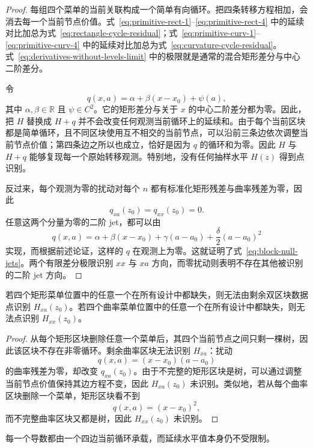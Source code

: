 \begin{proof}
每组四个菜单的当前关联构成一个简单有向循环。把四条转移方程相加，会消去每一个当前节点价值。式~\eqref{eq:primitive-rect-1}--\eqref{eq:primitive-rect-4} 中的延续对比加总为式~\eqref{eq:rectangle-cycle-residual}；式~\eqref{eq:primitive-curv-1}--\eqref{eq:primitive-curv-4} 中的延续对比加总为式~\eqref{eq:curvature-cycle-residual}。式~\eqref{eq:derivatives-without-levels-limit} 中的极限就是通常的混合矩形差分与中心二阶差分。

令
\[
q(x,a)=\alpha+\beta(x-x_0)+\psi(a),
\]
其中 $\alpha,\beta\in\mathbb R$ 且 $\psi\in C^2$。它的矩形差分与关于 $x$ 的中心二阶差分都为零。因此，把 $H$ 替换成 $H+q$ 并不会改变任何观测当前循环上的延续和。由于每个当前区块都是简单循环，且不同区块使用互不相交的当前节点，可以沿前三条边依次调整当前节点价值；第四条边之所以也成立，恰好是因为 $q$ 的循环和为零。因此 $H$ 与 $H+q$ 能够复现每一个原始转移观测。特别地，没有任何抽样水平 $H(z)$ 得到点识别。

反过来，每个观测为零的扰动对每个 $n$ 都有标准化矩形残差与曲率残差为零，因此
\[
q_{xa}(z_0)=q_{xx}(z_0)=0.
\]
任意这两个分量为零的二阶 jet，都可以由
\[
q(x,a)
=
\alpha+\beta(x-x_0)+\gamma(a-a_0)
+\frac{\delta}{2}(a-a_0)^2
\]
实现，而根据前述论证，这样的 $q$ 在观测上为零。这就证明了式~\eqref{eq:block-null-jets}。两个有限差分极限识别 $xx$ 与 $xa$ 方向，而零扰动则表明不存在其他被识别的二阶 jet 方向。
\end{proof}

\begin{corollary}[双区块设计中的边最小性]
\label{cor:two-block-edge-minimal}
若四个矩形菜单位置中的任意一个在所有设计中都缺失，则无法由剩余双区块数据点识别 $H_{xa}(z_0)$。若四个曲率菜单位置中的任意一个在所有设计中都缺失，则无法点识别 $H_{xx}(z_0)$。
\end{corollary}

\begin{proof}
从每个矩形区块删除任意一个菜单后，其四个当前节点之间只剩一棵树，因此该区块不存在非零循环。剩余曲率区块无法识别 $H_{xa}$：扰动
\[
q(x,a)=(x-x_0)(a-a_0)
\]
的曲率残差为零，却改变 $q_{xa}(z_0)$。由于不完整的矩形区块是树，可以通过调整当前节点价值保持其边方程不变，因此 $H_{xa}(z_0)$ 未识别。类似地，若从每个曲率区块删除一个菜单，矩形区块看不到
\[
q(x,a)=(x-x_0)^2,
\]
而不完整曲率区块又都是树，因此 $H_{xx}(z_0)$ 未识别。
\end{proof}

每一个导数都由一个四边当前循环承载，而延续水平值本身仍不受限制。

